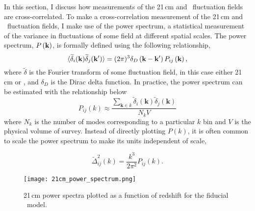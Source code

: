 \label{sec:cross-power}

In this section, I discuss how measurements of the 21\,cm and \lya\ fluctuation fields are
cross-correlated. To make a cross-correlation measurement of the 21\,cm and \lya\
fluctuation fields, I make use of the power spectrum, a statistical measurement
of the variance in fluctuations of some field at different spatial scales. The power
spectrum, $P \left({\bf k} \right)$, is formally defined using the following relationship,
\begin{equation}
\langle \widetilde{\delta}_i ({\bf k}) \widetilde{\delta}_j ({\bf k'}) \rangle = (2 \pi) ^3 \delta_D \left( {\bf k} - {\bf k'} \right) P_{ij} \left({\bf k} \right),
\end{equation}
where $\widetilde{\delta}$ is the Fourier transform of some fluctuation field, in this
case either 21\,cm or \lya, and $\delta_D$ is the Dirac delta function.
In practice, the power spectrum can be estimated with the relationship below
\begin{equation}
P_{ij}\left( k\right) \approx \frac{\sum_{\textbf{k} \in k} \widetilde{\delta}_i \left( \textbf{k}\right) \widetilde{\delta}_j \left( \textbf{k}\right)}{N_k V}
\end{equation}
where $N_k$ is the number of modes corresponding to a particular $k$ bin and $V$ is
the physical volume of survey. Instead of directly plotting $P\left( k\right)$,
it is often common to scale the power spectrum to make its units independent of
scale,

\begin{equation}
    \widetilde{\Delta}^2_{ij} \left( k \right) = \frac{k^3}{2 \pi ^2} P_{ij} \left( k \right).
\end{equation}

\begin{figure}[ht]
	\centering
	\texttt{[image: 21cm\_power\_spectrum.png]}
	\caption[21\,cm Power Spectrum]{21\,cm power spectra plotted as a function of redshift for the fiducial \fastsim\
           model.}
	\label{fig:21cm_ps}
\end{figure}

